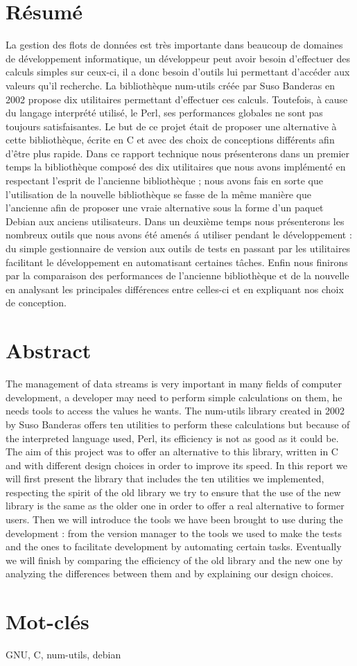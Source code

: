 \section*{R\'esum\'e}

La gestion des flots de donn\'ees est tr\`es importante dans beaucoup de domaines de d\'eveloppement informatique, un d\'eveloppeur peut avoir besoin d'effectuer des calculs simples sur ceux-ci, il a donc besoin d'outils lui permettant d'acc\'eder aux valeurs qu'il recherche. La biblioth\`eque num-utils cr\'e\'ee par Suso Banderas en 2002 propose dix utilitaires permettant d'effectuer ces calculs. Toutefois, \`a cause du langage interpr\'et\'e utilis\'e, le Perl, ses performances globales ne sont pas toujours satisfaisantes. Le but de ce projet \'etait de proposer une alternative \`a cette biblioth\`eque, \'ecrite en C et avec des choix de conceptions diff\'erents afin d'\^etre plus rapide. Dans ce rapport technique nous pr\'esenterons dans un premier temps la biblioth\`eque compos\'e des dix utilitaires que nous avons impl\'ement\'e en respectant l'esprit de l'ancienne biblioth\`eque ; nous avons fais en sorte que l'utilisation de la nouvelle biblioth\`eque se fasse de la m\^eme mani\`ere que l'ancienne afin de proposer une vraie alternative sous la forme d'un paquet Debian aux anciens utilisateurs. Dans un deuxi\`eme temps nous pr\'esenterons les nombreux outils que nous avons \'et\'e amen\'es \'a utiliser pendant le d\'eveloppement : du simple gestionnaire de version aux outils de tests en passant par les utilitaires facilitant le d\'eveloppement en automatisant certaines t\^aches. Enfin nous finirons par la comparaison des performances de l'ancienne biblioth\`eque et de la nouvelle en analysant les principales diff\'erences entre celles-ci et en expliquant nos choix de conception.

\section*{Abstract}

The management of data streams is very important in many fields of computer development, a developer may need to perform simple calculations on them, he needs tools to access the values he wants. The num-utils library created in 2002 by Suso Banderas offers ten utilities to perform these calculations but because of the interpreted language used, Perl, its efficiency is not as good as it could be. The aim of this project was to offer an alternative to this library, written in C and with different design choices in order to improve its speed. In this report we will first present  the library that includes the ten utilities we implemented, respecting the spirit of the old library we try to ensure that the use of the new library is the same as the older one in order to offer a real alternative to former users. Then we will introduce the tools we have been brought to use during the development : from the version manager to the tools we used to make the tests and the ones to facilitate development by automating certain tasks. Eventually we will finish by comparing the efficiency of the old library and the new one by analyzing the differences between them and by explaining our design choices.

\section*{Mot-cl\'es}

GNU, C, num-utils, debian
